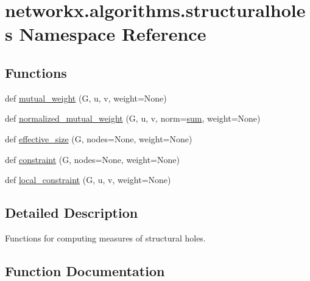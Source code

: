 \hypertarget{namespacenetworkx_1_1algorithms_1_1structuralholes}{}\section{networkx.\+algorithms.\+structuralholes Namespace Reference}
\label{namespacenetworkx_1_1algorithms_1_1structuralholes}
\subsection*{Functions}
\begin{DoxyCompactItemize}
\item 
def \hyperlink{namespacenetworkx_1_1algorithms_1_1structuralholes_ae88277a5a4f27775a56cf077c759d165}{mutual\+\_\+weight} (G, u, v, weight=None)
\item 
def \hyperlink{namespacenetworkx_1_1algorithms_1_1structuralholes_aad6692e85a58c9fb16f1be45606fa2b3}{normalized\+\_\+mutual\+\_\+weight} (G, u, v, norm=\hyperlink{assumed__shape_2foo__free_8f90_a1c860bb40bf43c289bc16f8634733f9a}{sum}, weight=None)
\item 
def \hyperlink{namespacenetworkx_1_1algorithms_1_1structuralholes_a249a78cb37c5b943131a3e30d8226e62}{effective\+\_\+size} (G, nodes=None, weight=None)
\item 
def \hyperlink{namespacenetworkx_1_1algorithms_1_1structuralholes_abd0530b51ac4c185cc1b48cc5f16739f}{constraint} (G, nodes=None, weight=None)
\item 
def \hyperlink{namespacenetworkx_1_1algorithms_1_1structuralholes_a0f8b873761a6f5741a63aec67fa7b346}{local\+\_\+constraint} (G, u, v, weight=None)
\end{DoxyCompactItemize}


\subsection{Detailed Description}
\begin{DoxyVerb}Functions for computing measures of structural holes.\end{DoxyVerb}
 

\subsection{Function Documentation}
\mbox{\label{namespacenetworkx_1_1algorithms_1_1structuralholes_abd0530b51ac4c185cc1b48cc5f16739f}} 

